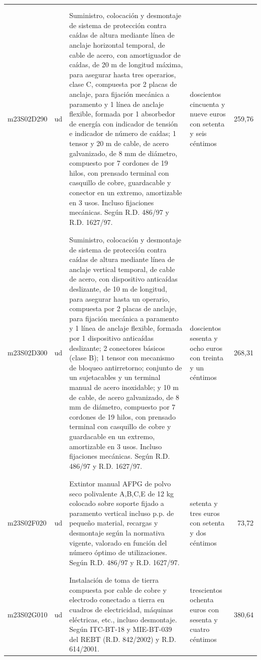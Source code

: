 \documentclass{book}%
\begin{document}
\begin{longtable}{|l|l|p{5cm}|p{3cm}|r|}
&&&&\\%
&&&&\\%
m23S02D290&ud&Suministro, colocación y desmontaje de sistema de protección contra caídas de altura mediante línea de anclaje horizontal temporal, de cable de acero, con amortiguador de caídas, de 20 m de longitud máxima, para asegurar hasta tres operarios, clase C, compuesta por 2 placas de anclaje, para fijación mecánica a paramento y 1 línea de anclaje flexible, formada por 1 absorbedor de energía con indicador de tensión e indicador de número de caídas; 1 tensor y 20 m de cable, de acero galvanizado, de 8 mm de diámetro, compuesto por 7 cordones de 19 hilos, con prensado terminal con casquillo de cobre, guardacable y conector en un extremo, amortizable en 3 usos. Incluso fijaciones mecánicas. Según R.D. 486/97 y R.D. 1627/97.&doscientos cincuenta y nueve euros con setenta y seis céntimos&259,76\\%
&&&&\\%
&&&&\\%
m23S02D300&ud&Suministro, colocación y desmontaje de sistema de protección contra caídas de altura mediante línea de anclaje vertical temporal, de cable de acero, con dispositivo anticaídas deslizante, de 10 m de longitud, para asegurar hasta un operario, compuesta por 2 placas de anclaje, para fijación mecánica a paramento y 1 línea de anclaje flexible, formada por 1 dispositivo anticaídas deslizante; 2 conectores básicos (clase B); 1 tensor con mecanismo de bloqueo antirretorno; conjunto de un sujetacables y un terminal manual de acero inoxidable; y 10 m de cable, de acero galvanizado, de 8 mm de diámetro, compuesto por 7 cordones de 19 hilos, con prensado terminal con casquillo de cobre y guardacable en un extremo, amortizable en 3 usos. Incluso fijaciones mecánicas. Según R.D. 486/97 y R.D. 1627/97.&doscientos sesenta y ocho euros con treinta y un céntimos&268,31\\%
&&&&\\%
&&&&\\%
m23S02F020&ud&Extintor manual AFPG de polvo seco polivalente A,B,C,E de 12 kg colocado sobre soporte fijado a paramento vertical incluso p.p. de pequeño material, recargas y desmontaje según la normativa vigente, valorado en función del número óptimo de utilizaciones. Según R.D. 486/97 y R.D. 1627/97.&setenta y tres euros con setenta y dos céntimos&73,72\\%
&&&&\\%
&&&&\\%
m23S02G010&ud&Instalación de toma de tierra compuesta por cable de cobre y electrodo conectado a tierra en cuadros de electricidad, máquinas eléctricas, etc., incluso desmontaje. Según ITC{-}BT{-}18 y MIE{-}BT{-}039 del REBT (R.D. 842/2002) y R.D. 614/2001.&trescientos ochenta euros con sesenta y cuatro céntimos&380,64\\%

\end{longtable}
\end{document}
